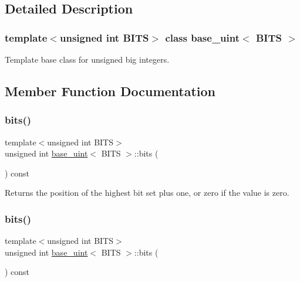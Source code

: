 \subsection{Detailed Description}
\subsubsection*{template$<$unsigned int B\+I\+TS$>$\newline
class base\+\_\+uint$<$ B\+I\+T\+S $>$}

Template base class for unsigned big integers. 

\subsection{Member Function Documentation}
\mbox{\label{classbase__uint_afe1eacc0b592cf184ac8ee0446997fbe}} 
\subsubsection{\texorpdfstring{bits()}{bits()}\hspace{0.1cm}{\footnotesize\ttfamily [1/2]}}
{\footnotesize\ttfamily template$<$unsigned int B\+I\+TS$>$ \\
unsigned int \mbox{\hyperlink{classbase__uint}{base\+\_\+uint}}$<$ B\+I\+TS $>$\+::bits (\begin{DoxyParamCaption}{ }\end{DoxyParamCaption}) const}

Returns the position of the highest bit set plus one, or zero if the value is zero. \mbox{\label{classbase__uint_afe1eacc0b592cf184ac8ee0446997fbe}} 
\subsubsection{\texorpdfstring{bits()}{bits()}\hspace{0.1cm}{\footnotesize\ttfamily [2/2]}}
{\footnotesize\ttfamily template$<$unsigned int B\+I\+TS$>$ \\
unsigned int \mbox{\hyperlink{classbase__uint}{base\+\_\+uint}}$<$ B\+I\+TS $>$\+::bits (\begin{DoxyParamCaption}{ }\end{DoxyParamCaption}) const}

